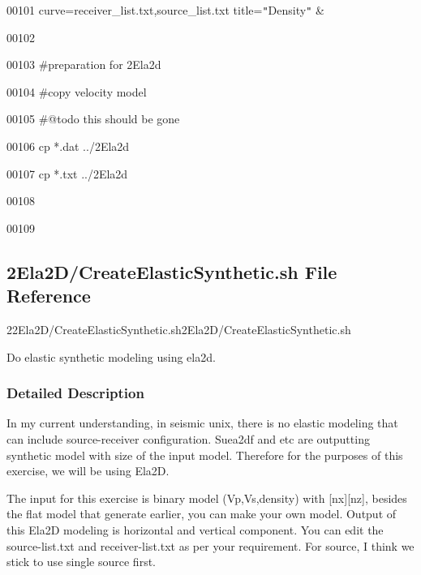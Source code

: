 \documentclass{article}
\begin{document}
\vspace{4pt}
\parindent=0pt
00101            curve=receiver\_list.txt,source\_list.txt title=\texttt{"}Density\texttt{"} 
\&\label{l00102}

\vspace{4pt}
00102 \label{l00103}

\vspace{4pt}
00103 \#preparation for 2Ela2d\label{l00104}

\vspace{4pt}
00104 \#copy velocity model\label{l00105}

\vspace{4pt}
00105 \#@todo this should be gone\label{l00106}

\vspace{4pt}
00106 cp *.dat ../2Ela2d\label{l00107}

\vspace{4pt}
00107 cp *.txt ../2Ela2d\label{l00108}

\vspace{4pt}
00108 \label{l00109}

\vspace{4pt}
00109 \newpage

\newpage
\vspace{36pt}
\subsection*{{\large{}\textbf{2Ela2D/CreateElasticSynthetic.sh File Reference}}}

\vspace{12pt}
22Ela2D/CreateElasticSynthetic.sh2Ela2D/CreateElasticSynthetic.sh\label{AAAAAAAAAE}

\vspace{12pt}
Do elastic synthetic modeling using ela2d. 

\vspace{24pt}
\subsubsection*{\textbf{Detailed Description}}

\vspace{1pt}
In my current understanding, in seismic unix, there is no elastic modeling that 
can include source-receiver configuration. Suea2df and etc are outputting synthetic 
model with size of the input model. Therefore for the purposes of this exercise, 
we will be using Ela2D. 

\vspace{1pt}
The input for this exercise is binary model (Vp,Vs,density) with [nx][nz], besides 
the flat model that generate earlier, you can make your own model. Output of this 
Ela2D modeling is horizontal and vertical component. You can edit the source-list.txt 
and receiver-list.txt as per your requirement. For source, I think we stick to 
use single source first. 
\end{document}
